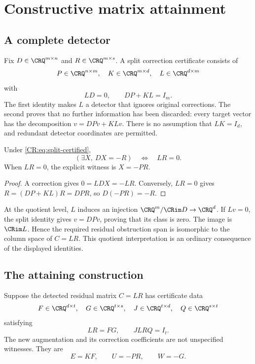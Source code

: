 \section{Constructive matrix attainment}\label{CR:cr-source-section-9}\label{CR:ch:matrix-attainment}
\subsection{A complete detector}
Fix $D\in\CRQ^{m\times n}$ and $R\in\CRQ^{m\times s}$. A split correction certificate consists of
\[
 P\in\CRQ^{n\times m},\quad K\in\CRQ^{m\times d},\quad L\in\CRQ^{d\times m}
\]
with
\begin{equation}\label{CR:eq:split-certified}
 LD=0,\qquad DP+KL=I_m.
\end{equation}
The first identity makes $L$ a detector that ignores original corrections. The second proves that no further information has been discarded: every target vector has the decomposition $v=DPv+KLv$. There is no assumption that $LK=I_d$, and redundant detector coordinates are permitted.

\begin{CRtheorem}\label{CR:thm:split-exact}
Under \eqref{CR:eq:split-certified},
\[
 (\exists X,\ DX=-R)\quad\Longleftrightarrow\quad LR=0.
\]
When $LR=0$, the explicit witness is $X=-PR$.
\end{CRtheorem}
\begin{proof}
A correction gives $0=LDX=-LR$. Conversely, $LR=0$ gives $R=(DP+KL)R=DPR$, so $D(-PR)=-R$.
\end{proof}

At the quotient level, $L$ induces an injection $\CRQ^m/\CRim D\to\CRQ^d$. If $Lv=0$, the split identity gives $v=DPv$, proving that its class is zero. The image is $\CRim L$. Hence the required residual obstruction span is isomorphic to the column space of $C=LR$. This quotient interpretation is an ordinary consequence of the displayed identities.

\subsection{The attaining construction}
Suppose the detected residual matrix $C=LR$ has certificate data
\[
 F\in\CRQ^{d\times t},\quad G\in\CRQ^{t\times s},\quad
 J\in\CRQ^{t\times d},\quad Q\in\CRQ^{s\times t}
\]
satisfying
\begin{equation}\label{CR:eq:factor-certified}
 LR=FG,\qquad JLRQ=I_t.
\end{equation}
The new augmentation and its correction coefficients are not unspecified witnesses. They are
\begin{equation}\label{CR:eq:attaining-formula}
 \boxed{E=KF,\qquad U=-PR,\qquad W=-G.}
\end{equation}

